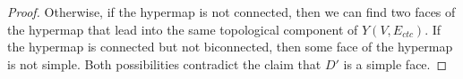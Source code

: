 \begin{proof}
  Otherwise, if the hypermap is
not connected, then we can find two faces of the hypermap that lead
into the same topological component of $Y(V,E_{ctc})$.  If the
hypermap is connected but not biconnected, then some face of the
hypermap is not simple.  Both possibilities contradict the claim that
$D'$ is a simple face.
\end{proof}



%  
%
%
%
%
%
%
%
%
%
%





